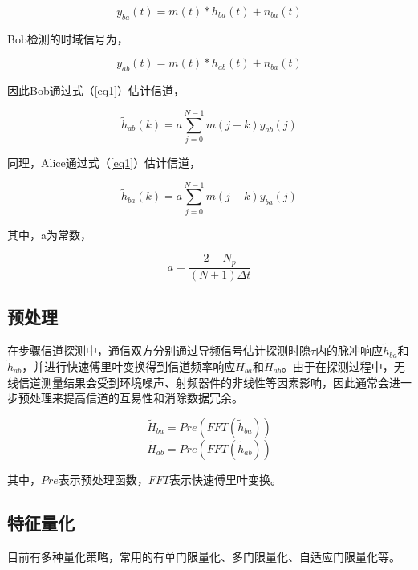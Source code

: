 \documentclass[master]{seuthesis} %
\begin{document}
\begin{Main}
\begin{equation}
    y_{ba}(t) = m(t) * h_{ba}(t) + n_{ba}(t) 
\end{equation}

Bob检测的时域信号为，

\begin{equation}
    y_{ab}(t) = m(t) * h_{ab}(t) + n_{ba}(t)    
\end{equation}

因此Bob通过式（\ref{eq1}）估计信道，

\begin{equation}
    \tilde{h}_{ab}(k) = a\sum_{j=0}^{N-1}m(j-k)y_{ab}(j)
\end{equation}
  
同理，Alice通过式（\ref{eq1}）估计信道，
  
\begin{equation}
    \tilde{h}_{ba}(k) = a\sum_{j=0}^{N-1}m(j-k)y_{ba}(j)
\end{equation}
  
其中，a为常数，

\begin{equation}
    a = \frac{2-N_p}{(N + 1)\Delta t}
\end{equation}

\subsection{预处理}

在步骤信道探测中，通信双方分别通过导频信号估计探测时隙$\tau$内的脉冲响应$\tilde{h}_{ba}$和$\tilde{h}_{ab}$，并进行快速傅里叶变换得到信道频率响应$\tilde{H}_{ba}$和$\tilde{H}_{ab}$。由于在探测过程中，无线信道测量结果会受到环境噪声、射频器件的非线性等因素影响，因此通常会进一步预处理来提高信道的互易性和消除数据冗余。

\begin{equation}
    \tilde{H}_{ba} = Pre(FFT(\tilde{h}_{ba}))
\end{equation}
\begin{equation}
    \tilde{H}_{ab} = Pre(FFT(\tilde{h}_{ab}))
\end{equation}

其中，$Pre$表示预处理函数，$FFT$表示快速傅里叶变换。

\subsection{特征量化}

目前有多种量化策略，常用的有单门限量化、多门限量化、自适应门限量化等。


\end{Main}
\end{document}
